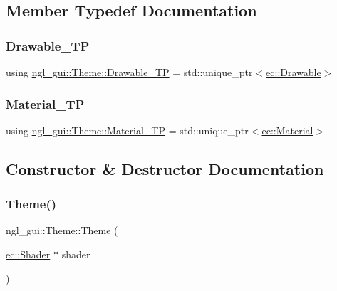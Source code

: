 \subsection{Member Typedef Documentation}
\mbox{\label{classngl__gui_1_1_theme_a43741a39898ef4b14443b980a2e6d67c}} 
\subsubsection{\texorpdfstring{Drawable\+\_\+\+TP}{Drawable\_TP}}
{\footnotesize\ttfamily using \mbox{\hyperlink{classngl__gui_1_1_theme_a43741a39898ef4b14443b980a2e6d67c}{ngl\+\_\+gui\+::\+Theme\+::\+Drawable\+\_\+\+TP}} =  std\+::unique\+\_\+ptr$<$\mbox{\hyperlink{classec_1_1_drawable}{ec\+::\+Drawable}}$>$}

\mbox{\label{classngl__gui_1_1_theme_a036278e436de3fbf75bce9d5a6743b9b}} 
\subsubsection{\texorpdfstring{Material\+\_\+\+TP}{Material\_TP}}
{\footnotesize\ttfamily using \mbox{\hyperlink{classngl__gui_1_1_theme_a036278e436de3fbf75bce9d5a6743b9b}{ngl\+\_\+gui\+::\+Theme\+::\+Material\+\_\+\+TP}} =  std\+::unique\+\_\+ptr$<$\mbox{\hyperlink{classec_1_1_material}{ec\+::\+Material}}$>$}



\subsection{Constructor \& Destructor Documentation}
\mbox{\label{classngl__gui_1_1_theme_a402ddc15ec480f0f0a4f0ab9a459d51d}} 
\subsubsection{\texorpdfstring{Theme()}{Theme()}}
{\footnotesize\ttfamily ngl\+\_\+gui\+::\+Theme\+::\+Theme (\begin{DoxyParamCaption}\item[{\mbox{\hyperlink{classec_1_1_shader}{ec\+::\+Shader}} $\ast$}]{shader }\end{DoxyParamCaption})\hspace{0.3cm}{\ttfamily [explicit]}}

